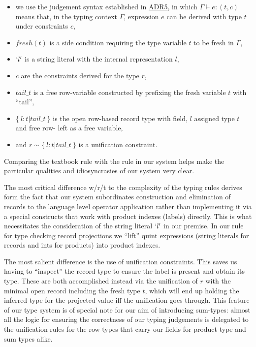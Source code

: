 \documentclass[11pt]{article}
\begin{document}
\begin{enumerate}
\begin{itemize}
\item we use the judgement syntax established in
\href{https://github.com/informalsystems/quint/tree/main/doc/adr005-type-system.md}{ADR5},
in which \(\Gamma \vdash e : (t, c)\) means that, in the typing
context \(\Gamma\), expression \(e\) can be derived with type \(t\)
under constraints \(c\),
\item \(fresh(t)\) is a side condition requiring the type variable \(t\) to
be fresh in \(\Gamma\),
\item \(`l'\) is a string literal with the internal representation \(l\),
\item \(c\) are the constraints derived for the type \(r\),
\item \(tail\_t\) is a free row-variable constructed by prefixing the fresh
variable \(t\) with ``tail'',
\item \(\{ \ l \colon t | tail\_t \ \}\) is the open row-based record type
with field, \(l\) assigned type \(t\) and free row- left as a free
variable,
\item and \(r \sim \{ \ l \colon t | tail\_t \ \}\) is a unification
constraint.
\end{itemize}

Comparing the textbook rule with the rule in our system helps make the
particular qualities and idiosyncrasies of our system very clear.

The most critical difference w/r/t to the complexity of the typing rules
derives form the fact that our system subordinates construction and
elimination of records to the language level operator application rather
than implementing it via a special constructs that work with product
indexes (labels) directly. This is what necessitates the consideration
of the string literal \(`l'\) in our premise. In our rule for type
checking record projections we ``lift'' quint expressions (string literals
for records and ints for products) into product indexes.

The most salient difference is the use of unification constraints. This
saves us having to ``inspect'' the record type to ensure the label is
present and obtain its type. These are both accomplished instead via the
unification of \(r\) with the minimal open record including the fresh
type \(t\), which will end up holding the inferred type for the
projected value iff the unification goes through. This feature of our
type system is of special note for our aim of introducing sum-types:
almost all the logic for ensuring the correctness of our typing
judgements is delegated to the unification rules for the row-types that
carry our fields for product type and sum types alike.


\end{enumerate}
\end{document}
